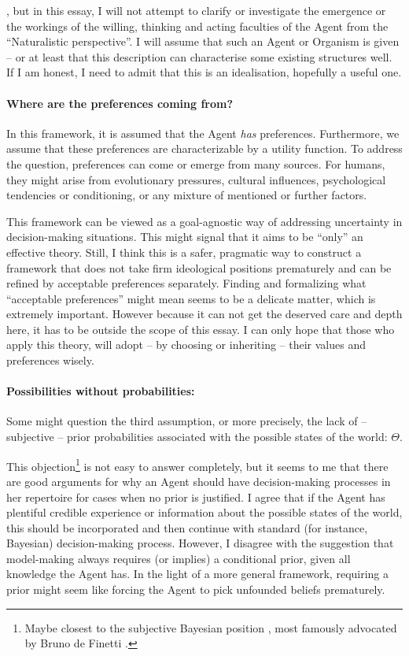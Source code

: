 \documentclass{article}
\begin{document}
, but in this essay, I will not attempt to clarify or investigate the emergence or the workings of the willing, thinking and acting faculties of the Agent from the ``Naturalistic perspective''. I will assume that such an Agent or Organism is given -- or at least that this description can characterise some existing structures well. If I am honest, I need to admit that this is an idealisation, hopefully a useful one.

\paragraph{Where are the preferences coming from?} In this framework, it is assumed that the Agent \emph{has} preferences. Furthermore, we assume that these preferences are characterizable by a utility function. To address the question, preferences can come or emerge from many sources. For humans, they might arise from evolutionary pressures, cultural influences, psychological tendencies or conditioning, or any mixture of mentioned or further factors.

This framework can be viewed as a goal-agnostic way of addressing uncertainty in decision-making situations. This might signal that it aims to be ``only'' an effective theory. Still, I think this is a safer, pragmatic way to construct a framework that does not take firm ideological positions prematurely and can be refined by acceptable preferences separately. Finding and formalizing what ``acceptable preferences'' might mean seems to be a delicate matter,  which is extremely important. However because it can not get the deserved care and depth here, it has to be 
outside the scope of this essay.
I can only hope that those who apply this theory, will adopt -- by choosing or inheriting -- their values and preferences wisely.

\paragraph{Possibilities without probabilities:}
Some might question the third assumption, or more precisely, the lack of – subjective – prior probabilities associated with the possible states of the world: $\Theta$. 

This objection\footnote{Maybe closest to the subjective Bayesian position \cite{sep:BayesianEpistemology}, most famously advocated by Bruno de Finetti \cite{book:deFinetti}.} is not easy to answer completely, but it seems to me that there are good arguments for why an Agent should have decision-making processes in her repertoire for cases when no prior is justified.
I agree that if the Agent has plentiful credible experience or information about the possible states of the world, this should be incorporated and then continue with standard (for instance, Bayesian) decision-making process.
However, I disagree with the suggestion that model-making always requires (or implies) a conditional prior, given all knowledge the Agent has. In the light of a more general framework, requiring a prior might seem like forcing the Agent to pick unfounded beliefs prematurely.
\end{document}
